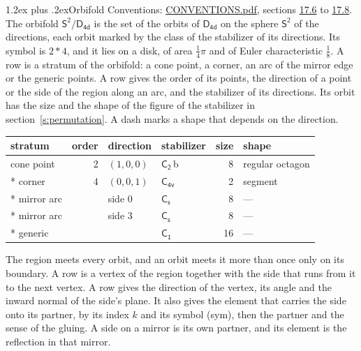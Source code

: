\documentclass[10pt,a4paper]{article}
\makeatletter
\renewcommand\section{\@startsection{section}{1}{\z@}{-3ex plus -1ex minus -.2ex}%
  {1.2ex plus .2ex}{\normalfont\large\sffamily\bfseries\color{parttitle}}}
\numberwithin{equation}{section}
\newcommand{\grp}[1]{\mathsf{#1}}
\newcommand{\orbname}[1]{#1}
\newcommand{\clsletter}[1]{\,{\scriptsize\color{black!55}#1}}
\newcommand{\dirvec}[3]{(#1, #2, #3)}
\newcommand{\twosphere}{\mathsf{S}^{2}}
\makeatother
\begin{document}
\section{Orbifold}\label{s:orbifold}
Conventions: \href{../../CONVENTIONS.pdf}{CONVENTIONS.pdf}, sections \href{../../CONVENTIONS.pdf\#conv.17.6}{17.6} to \href{../../CONVENTIONS.pdf\#conv.17.8}{17.8}.
The orbifold $\twosphere/\grp{D_{4d}}$ is the set of the orbits of $\grp{D_{4d}}$ on the sphere $\twosphere$ of the directions, each orbit marked by the class of the stabilizer of its directions. Its symbol is $\orbname{2{\ast}4}$, and it lies on a disk, of area $\tfrac{1}{4}\pi$ and of Euler characteristic $\tfrac{1}{8}$.
\leavevmode\label{n:head.stratum}\label{n:head.order.point}\label{n:head.direction}\label{n:head.stabilizer}\label{n:head.size.orbit}\label{n:head.shape}A row is a stratum of the orbifold: a cone point, a corner, an arc of the mirror edge or the generic points. A row gives the order of its points, the direction of a point or the side of the region along an arc, and the stabilizer of its directions. Its orbit has the size and the shape of the figure of the stabilizer in section~\ref{s:permutation}. A dash marks a shape that depends on the direction.
{\small\setlength{\tabcolsep}{4pt}\begin{longtable}{@{}lrllrl@{}}\toprule
stratum & order & direction & stabilizer & size & shape\\\midrule\endhead
\bottomrule\endfoot\endlastfoot
cone point & 2 & $\dirvec{1}{0}{0}$ & \href{C2.pdf}{$\grp{C_{2}}$}\clsletter{b} & 8 & regular octagon\\*
corner & 4 & $\dirvec{0}{0}{1}$ & \href{C4v.pdf}{$\grp{C_{4v}}$} & 2 & segment\\*
mirror arc &  & side 0 & \href{C1v.pdf}{$\grp{C_{s}}$} & 8 & ---\\*
mirror arc &  & side 3 & \href{C1v.pdf}{$\grp{C_{s}}$} & 8 & ---\\*
generic &  &  & \href{C1.pdf}{$\grp{C_{1}}$} & 16 & ---\\
\bottomrule\end{longtable}}
\leavevmode\label{n:head.vertex.region}\label{n:head.angle}\label{n:head.normal.side}\label{n:head.partner}\label{n:head.sense}The region meets every orbit, and an orbit meets it more than once only on its boundary. A row is a vertex of the region together with the side that runs from it to the next vertex. A row gives the direction of the vertex, its angle and the inward normal of the side's plane. It also gives the element that carries the side onto its partner, by its index $k$ and its symbol (sym), then the partner and the sense of the gluing. A side on a mirror is its own partner, and its element is the reflection in that mirror.
\end{document}
